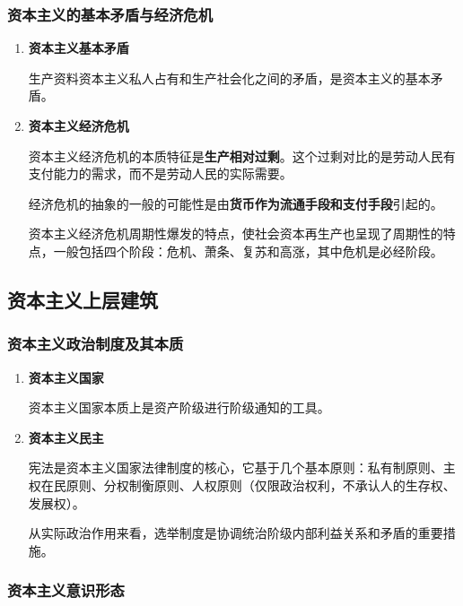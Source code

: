 \documentclass[12pt, a4paper, oneside]{ctexart}
\begin{document}
\subsubsection{资本主义的基本矛盾与经济危机}

\begin{enumerate}
  \item {\bf 资本主义基本矛盾}
  
  生产资料资本主义私人占有和生产社会化之间的矛盾，是资本主义的基本矛盾。

  \item {\bf 资本主义经济危机}
  
  资本主义经济危机的本质特征是\textbf{生产相对过剩}。这个过剩对比的是劳动人民有支付能力的需求，而不是劳动人民的实际需要。

  经济危机的抽象的一般的可能性是由\textbf{货币作为流通手段和支付手段}引起的。

  资本主义经济危机周期性爆发的特点，使社会资本再生产也呈现了周期性的特点，一般包括四个阶段：危机、萧条、复苏和高涨，其中危机是必经阶段。

\end{enumerate}

\subsection{资本主义上层建筑}

\subsubsection{资本主义政治制度及其本质}

\begin{enumerate}
  \item {\bf 资本主义国家}
  
  资本主义国家本质上是资产阶级进行阶级通知的工具。

  \item {\bf 资本主义民主}
  
  宪法是资本主义国家法律制度的核心，它基于几个基本原则：私有制原则、主权在民原则、分权制衡原则、人权原则（仅限政治权利，不承认人的生存权、发展权）。

  从实际政治作用来看，选举制度是协调统治阶级内部利益关系和矛盾的重要措施。

\end{enumerate}

\subsubsection{资本主义意识形态}
\end{document}
